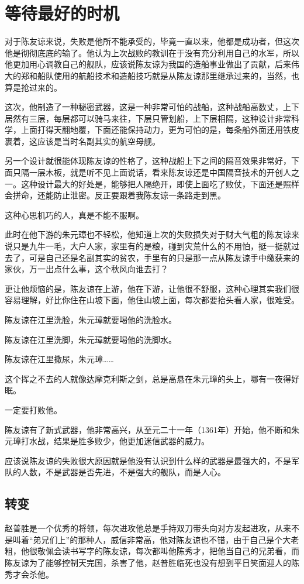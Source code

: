\section{等待最好的时机}
\ifnum{}
	\begin{multicols}{\theparacolNo}
		\fi
		对于陈友谅来说，失败是他所不能承受的，毕竟一直以来，他都是成功者，但这次他是彻彻底底的输了。他认为上次战败的教训在于没有充分利用自己的水军，所以他更加用心调教自己的舰队，应该说陈友谅为我国的造船事业做出了贡献，后来伟大的郑和船队使用的航船技术和造船技巧就是从陈友谅那里继承过来的，当然，也算是抢过来的。

		这次，他制造了一种秘密武器，这是一种非常可怕的战船，这种战船高数丈，上下居然有三层，每层都可以骑马来往，下层只管划船，上下层相隔，这种设计非常科学，上面打得天翻地覆，下面还能保持动力，更为可怕的是，每条船外面还用铁皮裹着，这应该是当时名副其实的航空母舰。

		另一个设计就很能体现陈友谅的性格了，这种战船上下之间的隔音效果非常好，下面只隔一层木板，就是听不见上面说话，看来陈友谅还是中国隔音技术的开创人之一。这种设计最大的好处是，能够把人隔绝开，即使上面吃了败仗，下面还是照样会拼命，还能防止泄密。反正要跟着我陈友谅一条路走到黑。

		这种心思机巧的人，真是不能不服啊。

		此时在他下游的朱元璋也不轻松，他知道上次的失败损失对于财大气粗的陈友谅来说只是九牛一毛，大户人家，家里有的是粮，碰到灾荒什么的不用怕，挺一挺就过去了，可是自己还是名副其实的贫农，手里有的只是那一点从陈友谅手中缴获来的家伙，万一出点什么事，这个秋风向谁去打？

		更让他烦恼的是，陈友谅在上游，他在下游，让他很不舒服，这种心理其实我们很容易理解，好比你住在山坡下面，他住山坡上面，每次都要抬头看人家，很难受。

		陈友谅在江里洗脸，朱元璋就要喝他的洗脸水。

		陈友谅在江里洗脚，朱元璋就要喝他的洗脚水。

		陈友谅在江里撒尿，朱元璋……

		这个挥之不去的人就像达摩克利斯之剑，总是高悬在朱元璋的头上，哪有一夜得好眠。

		一定要打败他。

		陈友谅有了新式武器，他非常高兴，从至元二十一年（1361年）开始，他不断和朱元璋打水战，结果是胜多败少，他更加迷信武器的威力。

		应该说陈友谅的失败很大原因就是他没有认识到什么样的武器是最强大的，不是军队的人数，不是武器是否先进，不是强大的舰队，而是人心。

		\subsection{转变}
		赵普胜是一个优秀的将领，每次进攻他总是手持双刀带头向对方发起进攻，从来不是叫着“弟兄们上”的那种人，威信非常高，他对陈友谅也不错，由于自己是个大老粗，他很敬佩会读书写字的陈友谅，每次都叫他陈秀才，把他当自己的兄弟看，而陈友谅为了能够控制天完国，杀害了他，赵普胜临死也没有想到平日笑面迎人的陈秀才会杀他。


\end{multicols}
